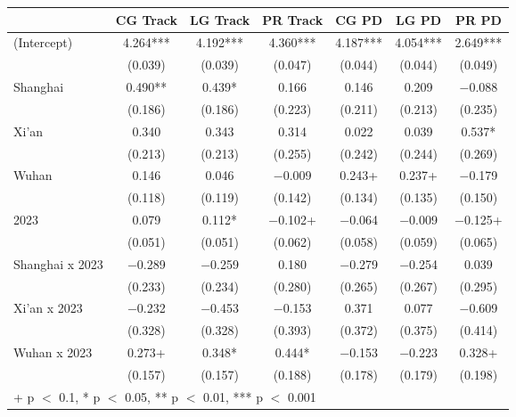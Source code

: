 \documentclass[
  letterpaper,
  DIV=11,
  numbers=noendperiod]{scrartcl}
\begin{document}
\begin{table}
\begin{minipage}[t]{\linewidth}
{}

\end{minipage}%
\newline
\begin{minipage}[t]{\linewidth}

{\centering 

\tabularnewline

\centering
\begin{tabular}[t]{lcccccc}
\toprule
  & CG Track & LG Track & PR Track & CG PD & LG PD & PR PD\\
\midrule
(Intercept) & \num{4.264}*** & \num{4.192}*** & \num{4.360}*** & \num{4.187}*** & \num{4.054}*** & \num{2.649}***\\
 & (\num{0.039}) & (\num{0.039}) & (\num{0.047}) & (\num{0.044}) & (\num{0.044}) & (\num{0.049})\\
Shanghai & \num{0.490}** & \num{0.439}* & \num{0.166} & \num{0.146} & \num{0.209} & \num{-0.088}\\
 & (\num{0.186}) & (\num{0.186}) & (\num{0.223}) & (\num{0.211}) & (\num{0.213}) & (\num{0.235})\\
Xi'an & \num{0.340} & \num{0.343} & \num{0.314} & \num{0.022} & \num{0.039} & \num{0.537}*\\
 & (\num{0.213}) & (\num{0.213}) & (\num{0.255}) & (\num{0.242}) & (\num{0.244}) & (\num{0.269})\\
Wuhan & \num{0.146} & \num{0.046} & \num{-0.009} & \num{0.243}+ & \num{0.237}+ & \num{-0.179}\\
 & (\num{0.118}) & (\num{0.119}) & (\num{0.142}) & (\num{0.134}) & (\num{0.135}) & (\num{0.150})\\
2023 & \num{0.079} & \num{0.112}* & \num{-0.102}+ & \num{-0.064} & \num{-0.009} & \num{-0.125}+\\
 & (\num{0.051}) & (\num{0.051}) & (\num{0.062}) & (\num{0.058}) & (\num{0.059}) & (\num{0.065})\\
Shanghai x 2023 & \num{-0.289} & \num{-0.259} & \num{0.180} & \num{-0.279} & \num{-0.254} & \num{0.039}\\
 & (\num{0.233}) & (\num{0.234}) & (\num{0.280}) & (\num{0.265}) & (\num{0.267}) & (\num{0.295})\\
Xi'an x 2023 & \num{-0.232} & \num{-0.453} & \num{-0.153} & \num{0.371} & \num{0.077} & \num{-0.609}\\
 & (\num{0.328}) & (\num{0.328}) & (\num{0.393}) & (\num{0.372}) & (\num{0.375}) & (\num{0.414})\\
Wuhan x 2023 & \num{0.273}+ & \num{0.348}* & \num{0.444}* & \num{-0.153} & \num{-0.223} & \num{0.328}+\\
 & (\num{0.157}) & (\num{0.157}) & (\num{0.188}) & (\num{0.178}) & (\num{0.179}) & (\num{0.198})\\
\bottomrule
\multicolumn{7}{l}{\rule{0pt}{1em}+ p $<$ 0.1, * p $<$ 0.05, ** p $<$ 0.01, *** p $<$ 0.001}\\
\end{tabular}

}
\end{minipage}
\end{table}
\end{document}
